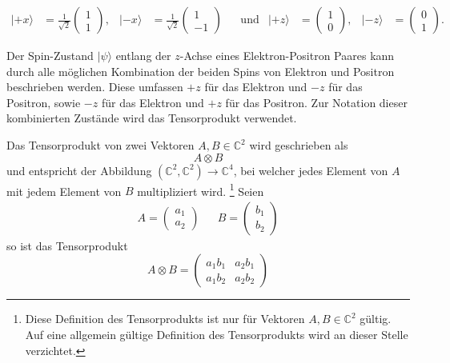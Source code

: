 \begin{refsection}
\begin{align}
    |{+}x\rangle &= \frac{1}{\sqrt{2}}\begin{pmatrix} 1\\1 \end{pmatrix}, &
    |{-}x\rangle &= \frac{1}{\sqrt{2}}\begin{pmatrix} 1\\-1 \end{pmatrix} &
    & \text{und} & 
    |{+}z\rangle &= \begin{pmatrix} 1\\0 \end{pmatrix}, &
    |{-}z\rangle &= \begin{pmatrix} 0\\1 \end{pmatrix}. &
\end{align}

Der Spin-Zustand $|\psi\rangle$ entlang der $z$-Achse eines 
Elektron-Positron Paares  kann durch alle m\"oglichen Kombination der beiden
Spins von Elektron und Positron beschrieben werden. 
Diese umfassen $+z$ f\"ur das Elektron und $-z$
f\"ur das Positron, sowie $-z$ f\"ur das Elektron und $+z$ f\"ur das Positron.
Zur Notation dieser kombinierten Zust\"ande wird das Tensorprodukt verwendet.

\begin{definition}\label{def:bell:tensorprodukt}
    Das Tensorprodukt von zwei Vektoren $A,B \in \mathbb{C}^2$  wird geschrieben als
    \[
        A \otimes B
    \]
    und entspricht der Abbildung $(\mathbb{C}^2,\mathbb{C}^2)\to\mathbb{C}^4$, 
    bei welcher jedes Element von $A$ mit jedem Element von $B$ multipliziert
    wird. \footnote{Diese Definition des Tensorprodukts ist nur f\"ur Vektoren
    $A,B \in \mathbb{C}^2$ g\"ultig. Auf eine allgemein g\"ultige Definition
    des Tensorprodukts wird an dieser Stelle verzichtet.}
    Seien
    \begin{align*}
        A = \begin{pmatrix} a_{1} \\ a_{2} \end{pmatrix}
        &&
        B = \begin{pmatrix} b_{1} \\ b_{2} \end{pmatrix}
    \end{align*}
    so ist das Tensorprodukt
    \[
        A \otimes B = \begin{pmatrix} 
        a_1 b_1 & a_2 b_1 \\ a_1 b_2 & a_2 b_2
        \end{pmatrix}
    \]
\end{definition}


\end{refsection}
